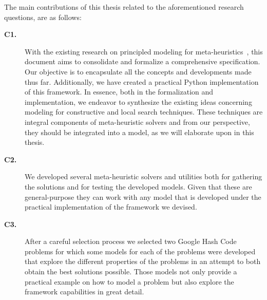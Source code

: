 The main contributions of this thesis related to the aforementioned research
questions, are as follows:

\vspace{0.5cm}

\begin{description}

  \item[\textbf{C1.}] With the existing research on principled modeling for
    meta-heuristics~\cite{vieira2009uma,fonseca2021nasf4nio,outeiro2021application},
    this document aims to consolidate and formalize a comprehensive specification.
    Our objective is to encapsulate all the concepts and developments made thus
    far. Additionally, we have created a practical Python implementation of this
    framework. In essence, both in the formalization and implementation, we
    endeavor to synthesize the existing ideas concerning modeling for constructive
    and local search techniques. These techniques are integral components of
    meta-heuristic solvers and from our perspective, they should be integrated
    into a model, as we will elaborate upon in this thesis.

  \item[\textbf{C2.}] We developed several meta-heuristic solvers and utilities
    both for gathering the solutions and for testing the developed models. Given
    that these are general-purpose they can work with any model that is developed
    under the practical implementation of the framework we devised.

  \item[\textbf{C3.}] After a careful selection process we selected two Google Hash Code
    problems for which some models for each of the problems were developed that
    explore the different properties of the problems in an attempt to both obtain the best solutions
    possible. Those models not only provide a practical example on how to model a problem but
    also explore the framework capabilities in great detail.
\end{description}